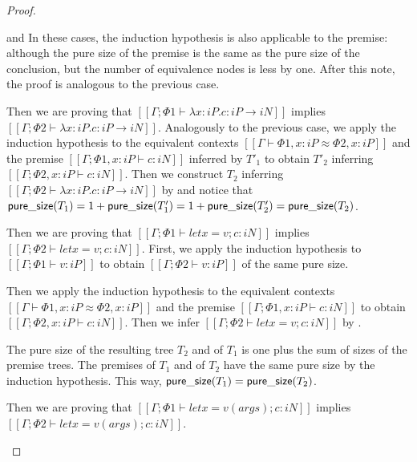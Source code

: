 \begin{proof}
\begin{caseof}
        \item {} and 
            In these cases, the induction hypothesis is also applicable to the premise:
            although the pure size of the premise is the same as the pure size of the conclusion,
            but the number of equivalence nodes is less by one.
            After this note, the proof is analogous to the previous case.

        \item {}
            Then we are proving that 
            $[[Γ ; Φ1 ⊢ λx:iP.c : iP → iN]]$ implies $[[Γ ; Φ2 ⊢ λx:iP.c : iP → iN]]$.
            Analogously to the previous case, 
            we apply the induction hypothesis to the
            equivalent contexts $[[Γ ⊢ Φ1, x:iP ≈ Φ2, x:iP]]$
            and the premise $[[Γ ; Φ1, x:iP ⊢ c : iN]]$
            inferred by $T'_1$ to obtain
            $T'_2$ inferring $[[Γ ; Φ2, x:iP ⊢ c : iN]]$.
            Then we construct $T_2$ inferring $[[Γ ; Φ2 ⊢ λx:iP.c : iP → iN]]$ by 
            and notice that $\mathsf{pure\_size}(T_1) = 1 + \mathsf{pure\_size}(T'_1) = 1 + \mathsf{pure\_size}(T'_2) = \mathsf{pure\_size}(T_2)$.

        \item {}
            Then we are proving that 
            $[[Γ ; Φ1 ⊢ let x = v; c : iN]]$ implies $[[Γ ; Φ2 ⊢ let x = v; c : iN]]$.
            First, we apply the induction hypothesis to 
            $[[Γ; Φ1 ⊢ v : iP]]$ to obtain $[[Γ; Φ2 ⊢ v : iP]]$ 
            of the same pure size.
            
            Then we apply the induction hypothesis to
            the equivalent contexts $[[Γ ⊢ Φ1, x:iP ≈ Φ2, x:iP]]$
            and the premise $[[Γ ; Φ1, x:iP ⊢ c : iN]]$ to obtain
            $[[Γ ; Φ2, x:iP ⊢ c : iN]]$.
            Then we infer $[[Γ ; Φ2 ⊢ let x = v; c : iN]]$ by .

            The pure size of the resulting tree $T_2$ and of $T_1$ is
            one plus the sum of sizes of the premise trees.
            The premises of $T_1$ and of $T_2$ have the same pure size by 
            the induction hypothesis. This way, $\mathsf{pure\_size}(T_1) = \mathsf{pure\_size}(T_2)$.

        \item {}
            Then we are proving that 
            $[[Γ ; Φ1 ⊢ let x = v(args); c : iN]]$ implies 
            $[[Γ ; Φ2 ⊢ let x = v(args); c : iN]]$.


\end{caseof}
\end{proof}
